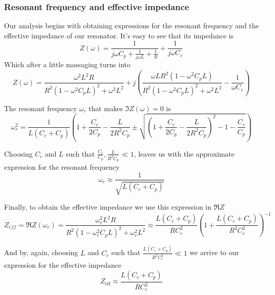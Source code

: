 \documentclass[../main.tex]{subfiles}
\begin{document}
\subsubsection{Resonant frequency and effective impedance}
Our analysis begins with obtaining expressions for the resonant frequency and
the effective impedance of our resonator. It's easy to see that its impedance is
\begin{equation}
\label{eq:ImpParallel}
    Z(\omega) = \frac{1}{j \omega C_{p} + \frac{1}{j \omega L} + \frac{1}{R}}
        + \frac{1}{j \omega C_{c}}
\end{equation}
Which after a little massaging turns into
\begin{equation*}
\label{eq:ImpParallelBinomial}
    Z(\omega) = \frac{\omega^2 L^2 R}{R^2(1-\omega^2C_{p}L)^2 + \omega^2 L^2} +
        j \left(
            \frac{\omega L R^2 (1-\omega^2C_{p}L)}{R^2(1-\omega^2C_{p}L)^2 + \omega^2 L^2}
            - \frac{1}{\omega C_{c}}
          \right)
\end{equation*}

The resonant frequency \(\omega_{r}\) that makes \(\Im Z(\omega) = 0\) is
\begin{equation*}
\label{eq:ExactWr}
    \omega_{r}^2 = \frac{1}{L(C_{c} + C_{p})}
    \left(
        1 + \frac{C_{c}}{2C_{p}} - \frac{L}{2 R^2 C_{p}} \pm
        \sqrt{\left(1 + \frac{C_{c}}{2C_{p}} - \frac{L}{2 R^2 C_{p}}\right)^2
        - 1 - \frac{C_{c}}{C_{p}}}
    \right)
\end{equation*}

Choosing \(C_{c}\) and \(L\) such that
\(\frac{C_{c}}{C_{p}}, \frac{L}{R^2 C_{p}} \ll 1\), leaves us with the
approximate expression for the resonant frequency
\begin{equation}
\label{eq:Wr}
\omega_{r} \approx \frac{1}{\sqrt{L (C_{c} + C_{p})}}
\end{equation}

Finally, to obtain the effective impedance we use this expression in \(\Re Z\)
\begin{equation*}
\label{eq:ExactZeff}
    Z_{eff} = \Re Z(\omega_{r}) =
    \frac{\omega_{r}^2 L^2 R}{R^2(1-\omega_{r}^2C_{p}L)^2 + \omega_{r}^2 L^2}
    \approx \frac{L (C_{c} + C_{p})}{R C_{c}^2}
      \left(1 + \frac{L (C_{c} + C_{p})}{R^2 C_{c}^2}\right)^{-1}
\end{equation*}

And by, again, choosing \(L\) and \(C_{c}\) such that
\(\frac{L (C_{c} + C_{p})}{R^2 C_{c}^2} \ll 1\) we arrive to our expression for
the effective impedance
\begin{equation}
\label{eq:Zeff}
    Z_{\text{eff}} \approx \frac{L (C_{c} + C_{p})}{R C_{c}^2}
\end{equation}
\end{document}
